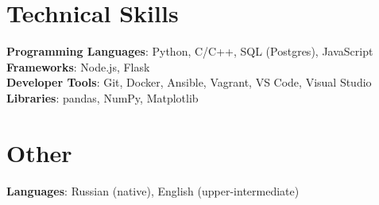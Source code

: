 \section{Technical Skills}
\begin{itemize}[leftmargin=0.15in, label={}]
  \small{\item{
        \textbf{Programming Languages}{: Python, C/C++, SQL (Postgres), JavaScript} \\
        \textbf{Frameworks}{: Node.js, Flask} \\
        \textbf{Developer Tools}{: Git, Docker, Ansible, Vagrant, VS Code, Visual Studio} \\
        \textbf{Libraries}{: pandas, NumPy, Matplotlib}
        }}
\end{itemize}

\section{Other}
\begin{itemize}[leftmargin=0.15in, label={}]
  \small{\item{
        \textbf{Languages}{: Russian (native), English (upper-intermediate)} \\
        }}
\end{itemize}